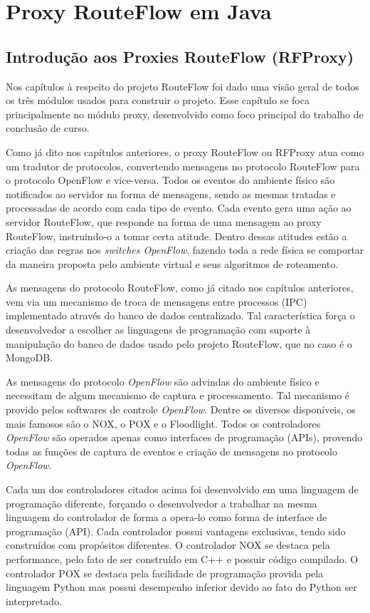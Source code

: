 \chapter{Proxy RouteFlow em Java}

\section{Introdução aos Proxies RouteFlow (RFProxy)}

Nos capítulos à respeito do projeto RouteFlow foi dado
uma visão geral de todos os três módulos usados para
construir o projeto. Esse capítulo se foca principalmente no 
módulo proxy, desenvolvido como foco principal do trabalho de
conclusão de curso.

Como já dito nos capítulos anteriores, o proxy RouteFlow ou
RFProxy atua como um tradutor de protocolos, convertendo
mensagens no protocolo RouteFlow para o protocolo OpenFlow
e vice-versa. Todos os eventos do ambiente físico são notificados
ao servidor na forma de mensagens, sendo as mesmas tratadas 
e processadas de acordo com cada tipo de evento. Cada evento gera uma 
ação ao servidor RouteFlow, que responde na forma de uma 
mensagem ao proxy RouteFlow, instruindo-o a tomar certa atitude.
Dentro dessas atitudes estão a criação das regras nos \textit{
switches OpenFlow}, fazendo toda a rede física se comportar
da maneira proposta pelo ambiente virtual e seus algoritmos de
roteamento.

As mensagens do protocolo RouteFlow, como já citado nos
capítulos anteriores, vem via um mecanismo de troca de mensagens
entre processos (IPC) implementado através do banco de dados
centralizado. Tal característica força o desenvolvedor a escolher
as linguagens de programação com suporte à manipulação do
banco de dados usado pelo projeto RouteFlow, que no caso
é o MongoDB.

As mensagens do protocolo \textit{OpenFlow} são advindas do ambiente
físico e necessitam de algum mecanismo de captura e processamento.
Tal mecanismo é provido pelos softwares de controle \textit{
OpenFlow}. Dentre os diversos disponíveis, os mais famosos
são o NOX, o POX e o Floodlight. Todos os controladores
\textit{OpenFlow} são operados apenas como 
interfaces de programação (APIs), provendo todas as funções de captura
de eventos e criação de mensagens no protocolo \textit{OpenFlow}.

Cada um dos controladores citados acima foi desenvolvido em
uma linguagem de programação diferente, forçando o desenvolvedor
a trabalhar na mesma linguagem do controlador de forma a 
opera-lo como forma de interface de programação (API). 
Cada controlador possui vantagens exclusivas, tendo sido construídos
com propósitos diferentes. O controlador NOX se destaca pela
performance, pelo fato de ser construído em C++ e possuir
código compilado. O controlador POX se destaca pela
facilidade de programação provida pela linguagem Python mas
possui desempenho inferior devido ao fato do Python ser
interpretado. 

